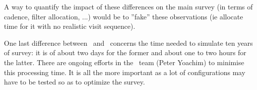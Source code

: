 A way to quantify the impact of these differences on the main survey (in terms of cadence, filter allocation, ...) would be to ''fake'' these observations (ie allocate time for it with no realistic visit sequence).

One last difference between \opsim~and \altsched~concerns the time needed to simulate ten years of survey: it is of about two days for the former and about one to two hours for the latter. There are ongoing efforts in the \opsim~team (Peter Yoachim) to minimise this processing time. It is all the more important as a lot of configurations may have to be tested so as to optimize the survey.  
